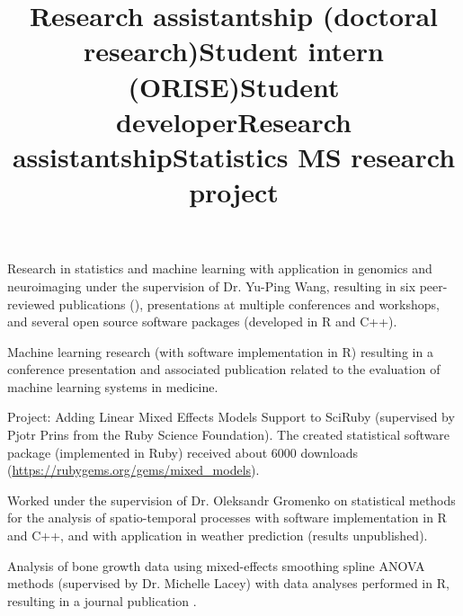 \documentclass[overlapped, line, 10pt]{res} %
\begin{document}
\begin{resume}
\title{Research assistantship (doctoral research)}
\begin{position}
  Research in statistics and machine learning with application in genomics and neuroimaging under the supervision of Dr. Yu-Ping Wang, resulting in six peer-reviewed publications (\cite{gossmann2015, cao2015BCB, cao2015bioinformatics, Gossmann2017-yu, Gossmann2017-ln, brzyski2016}), presentations at multiple conferences and workshops, and several open source software packages (developed in R and C++).
\end{position}

\title{Student intern (ORISE)}
\begin{position}
  Machine learning research (with software implementation in R) resulting in a conference presentation and associated publication \cite{gossmann2018} related to the evaluation of machine learning systems in medicine.
\end{position}

\title{Student developer}
\begin{position}
  Project: Adding Linear Mixed Effects Models Support to SciRuby (supervised by Pjotr Prins from the Ruby Science Foundation). The created statistical software package (implemented in Ruby) received about 6000 downloads (\url{https://rubygems.org/gems/mixed_models}).%
\end{position}

\title{Research assistantship}
\begin{position}
  Worked under the supervision of Dr. Oleksandr Gromenko on statistical methods for the analysis of spatio-temporal processes with software implementation in R and C++, and with application in weather prediction (results unpublished).
\end{position}

\title{Statistics MS research project}
\begin{position}
  Analysis of bone growth data using mixed-effects smoothing spline ANOVA methods (supervised by Dr. Michelle Lacey) with data analyses performed in R, resulting in a journal publication \cite{sammarco2015}.
\end{position}


\end{resume}
\end{document}
